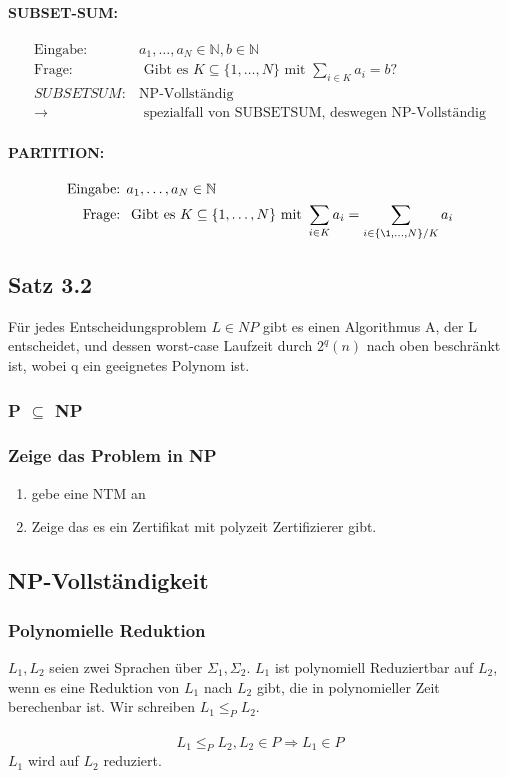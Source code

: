 \documentclass[a4paper, 10pt]{article}
\theoremstyle{definition}
\begin{document}
\paragraph{SUBSET-SUM:}
\begin{align*}
    \text{Eingabe: }&a_1,\dots,a_N\in\mathbb{N},b\in\mathbb{N}\\
    \text{Frage: }&\text{ Gibt es }K\subseteq\{1,\dots,N\}\text{ mit }\sum_{i\in K}a_i=b?\\
    SUBSETSUM:& \text{NP-Vollständig}\\
    \to&\text{ spezialfall von SUBSETSUM, deswegen NP-Vollständig}
\end{align*}
\paragraph{PARTITION:}
\begin{align*}
    \text{Eingabe: }&a_1,\dots,a_N\in\mathbb{N}\\
    \text{Frage: }&\text{ Gibt es }K\subseteq\{1,\dots,N\}\text{ mit }\sum_{i\in K}a_i=\sum_{i\in\{\1,\dots,N\}/K}a_i
\end{align*}
\subsection{Satz 3.2} Für jedes Entscheidungsproblem $L\in NP$ gibt es einen Algorithmus A, der L entscheidet, und dessen worst-case Laufzeit durch $2^q(n)$ nach oben beschränkt ist, wobei q ein geeignetes Polynom ist.

\subsubsection{P $\subseteq$ NP}
\subsubsection{Zeige das Problem in NP}
\begin{enumerate}
    \item gebe eine NTM an
    \item Zeige das es ein Zertifikat mit polyzeit Zertifizierer gibt.
\end{enumerate}
\subsection{NP-Vollständigkeit}
\subsubsection{Polynomielle Reduktion}
$L_1,L_2$ seien zwei Sprachen über $\Sigma_1,\Sigma_2$. $L_1$ ist polynomiell Reduziertbar auf $L_2$, wenn es eine Reduktion von $L_1$ nach $L_2$ gibt, die in polynomieller Zeit berechenbar ist. Wir schreiben $L_1\leq_P L_2$.\\ \\
\begin{equation*}
    L_1\leq_P L_2, L_2\in P\Rightarrow L_1\in P
\end{equation*}
$L_1$ wird auf $L_2$ reduziert.
\end{document}
